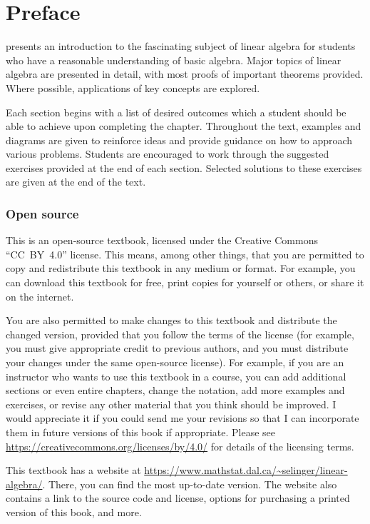 \chapter*{Preface}

\textit{\bookfulltitle} presents an introduction to the fascinating
subject of linear algebra for students who have a reasonable
understanding of basic algebra. Major topics of linear algebra are
presented in detail, with most proofs of important theorems
provided. Where possible, applications of key concepts are explored.

Each section begins with a list of desired outcomes which a student
should be able to achieve upon completing the chapter.  Throughout the
text, examples and diagrams are given to reinforce ideas and provide
guidance on how to approach various problems. Students are encouraged
to work through the suggested exercises provided at the end of each
section. Selected solutions to these exercises are given at the end of
the text.

\subsection*{Open source}

This is an open-source textbook, licensed under the Creative Commons
``CC~BY~4.0'' license. This means, among other things, that you are
permitted to copy and redistribute this textbook in any medium or
format. For example, you can download this textbook for free, print
copies for yourself or others, or share it on the internet.

You are also permitted to make changes to this textbook and distribute
the changed version, provided that you follow the terms of the license
(for example, you must give appropriate credit to previous authors,
and you must distribute your changes under the same open-source
license). For example, if you are an instructor who wants to use this
textbook in a course, you can add additional sections or even entire
chapters, change the notation, add more examples and exercises, or
revise any other material that you think should be improved. I would
appreciate it if you could send me your revisions so that I can
incorporate them in future versions of this book if
appropriate. Please see
\url{https://creativecommons.org/licenses/by/4.0/}
for details of the licensing terms.

This textbook has a website at
\url{https://www.mathstat.dal.ca/~selinger/linear-algebra/}.
There, you can find the most up-to-date version. The website
also contains a link to the source code and license, options for
purchasing a printed version of this book, and more.

